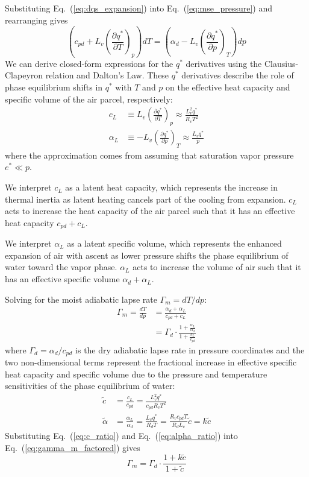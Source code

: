 \documentclass[]{ametsocV6.1}
\begin{document}
Substituting Eq.~(\ref{eq:dqs_expansion}) into Eq.~(\ref{eq:mse_pressure}) and rearranging gives
\begin{equation}
\left(c_{pd} + L_v\left(\frac{\partial q^*}{\partial T}\right)_p \right)dT = \left(\alpha_d - L_v\left(\frac{\partial q^*}{\partial p}\right)_T\right)dp \label{eq:rearranged}
\end{equation}
We can derive closed-form expressions for the $q^*$ derivatives using the Clausius-Clapeyron relation and Dalton's Law. These $q^*$ derivatives describe the role of phase equilibrium shifts in $q^*$ with $T$ and $p$ on the effective heat capacity and specific volume of the air parcel, respectively:
\begin{align}
c_L &\equiv L_v\left(\frac{\partial q^*}{\partial T}\right)_p \approx \frac{L_v^2 q^*}{R_v T^2}
\label{eq:c_L} \\
\alpha_L &\equiv -L_v\left(\frac{\partial q^*}{\partial p}\right)_T \approx \frac{L_v q^*}{p}
\label{eq:alpha_L}
\end{align}
where the approximation comes from assuming that saturation vapor pressure $e^* \ll p$.

We interpret $c_L$ as a latent heat capacity, which represents the increase in thermal inertia as latent heating cancels part of the cooling from expansion. $c_L$ acts to increase the heat capacity of the air parcel such that it has an effective heat capacity $c_{pd} + c_L$.

We interpret $\alpha_L$ as a latent specific volume, which represents the enhanced expansion of air with ascent as lower pressure shifts the phase equilibrium of water toward the vapor phase. $\alpha_L$ acts to increase the volume of air such that it has an effective specific volume $\alpha_d + \alpha_L$.

Solving for the moist adiabatic lapse rate $\Gamma_m = dT/dp$:
\begin{align}
\Gamma_m = \frac{dT}{dp} &= \frac{\alpha_d +\alpha_L}{c_{pd} + c_L} \label{eq:gamma_m_ratio} \\
&= \Gamma_d \cdot \frac{1+\frac{\alpha_L}{\alpha_d}}{1+\frac{c_L}{c_{pd}}} \label{eq:gamma_m_factored}
\end{align}
where $\Gamma_d = \alpha_d / c_{pd}$ is the dry adiabatic lapse rate in pressure coordinates and the two non-dimensional terms represent the fractional increase in effective specific heat capacity and specific volume due to the pressure and temperature sensitivities of the phase equilibrium of water:
\begin{align}
\tilde{c} &= \frac{c_L}{c_{pd}} = \frac{L_v^2 q^*}{c_{pd} R_v T^2} \label{eq:c_ratio} \\
\tilde{\alpha} &= \frac{\alpha_L}{\alpha_d} = \frac{L_v q^*}{R_d T} = \frac{R_v c_{pd}T}{R_dL_v}\tilde{c} = k\tilde{c} \label{eq:alpha_ratio}
\end{align}
Substituting Eq.~(\ref{eq:c_ratio}) and Eq.~(\ref{eq:alpha_ratio}) into Eq.~(\ref{eq:gamma_m_factored}) gives
\begin{equation}
\Gamma_m = \Gamma_d \cdot \frac{1 + k\tilde{c}}{1 + \tilde{c}} \label{eq:gamma_m_tilde}
\end{equation}
\end{document}
